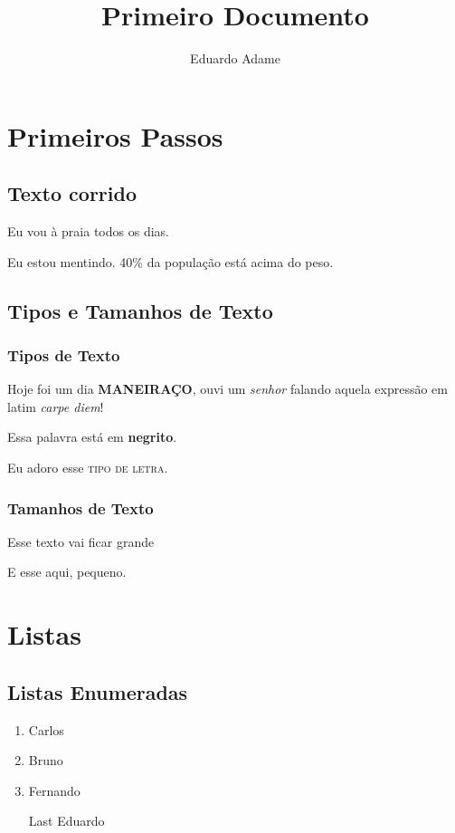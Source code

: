 \documentclass[12pt,a4paper]{article}
\author{Eduardo Adame}
\title{Primeiro Documento}
\begin{document}
\maketitle
\newpage

\tableofcontents
\newpage

\section{Primeiros Passos}
\subsection{Texto corrido}

Eu vou à praia todos os dias. %

Eu estou mentindo. 40\% da população está acima do peso.
\subsection{Tipos e Tamanhos de Texto}
\subsubsection{Tipos de Texto}

Hoje foi um dia \textbf{MANEIRAÇO}, ouvi um \emph{senhor} falando aquela expressão em latim \textit{carpe diem}! 

Essa palavra está em \textbf{negrito}.

Eu adoro esse \textsc{tipo de letra}.
\subsubsection{Tamanhos de Texto}

Esse texto vai ficar {\Huge grande}

E esse aqui, {\tiny pequeno}.

\section{Listas}
\subsection{Listas Enumeradas}

\begin{enumerate}%
\item Carlos
\item Bruno
\item Fernando
\item[Last] Eduardo %
\end{enumerate}
\end{document}
